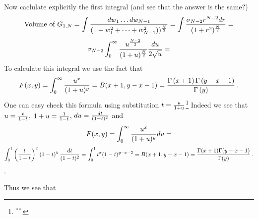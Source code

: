 Now caclulate explicitly the first integral (and see that the 
answer is the same?)
               $$\hbox {Volume of $G_{1,N}$}=
     \int {dw_1\dots dw_{N-1}\over 
(1+w_1^2+\dots+w_{N-1}^2))^{N\over 2}}=
\int {\sigma_{N-2}r^{N-2}dr\over (1+r^2)^{N\over 2}}=
               $$
              $$
       \sigma_{N-2}
                \int_0^{\infty} 
{u^{N-2\over 2}\over (1+u)^{N\over 2}}
           {du\over 2\sqrt u }= 
              $$
To calculate this  integral we use the fact that
                  $$
  F(x,y)=\int_0^\infty {u^x\over (1+u)^y}=B(x+1,y-x-1)=
            {
 \Gamma\left(x+1\right)
 \Gamma\left(y-x-1\right)
           \over
 \Gamma\left(y\right)
            }\,.
                  $$
One can easy check this formula using substitution
$t={u\over 1+u}$\footnote{$^{**}$}
{Indeed we see that
   $u={t\over 1-t}$, $1+u={1\over 1-t}$,
$du={dt\over (1-t)^2}$ and
     $$
  F(x,y)=\int_0^\infty  {u^x\over (1+u)^y}du=
                   $$
                    $$
   \int_0^1 \left(t\over 1-t\right)^x
              \left(1-t\right)^y {dt\over (1-t)^2}=
   \int_0^1 t^x (1-t)^{y-x-2}=B(x+1,y-x-1)=
       {\Gamma(x+1)
       \Gamma(y-x-1)\over
       \Gamma(y)}\,.
     $$              
}.

Thus we see that


